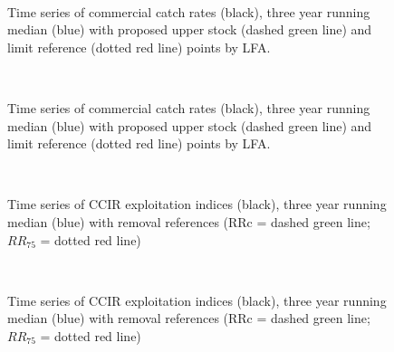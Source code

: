 \documentclass[11pt]{article}
\newcommand{\e}{/backup/bio_data/bio.lobster/figures/} %
\begin{document}
\begin{figure}
        \centering
         \\
                    \caption{Time series of commercial catch rates (black), three year running median (blue) with proposed upper stock (dashed green line) and limit reference (dotted red line) points by LFA.}
        \end{figure}


\begin{figure}
        \centering
         \\
                    \caption{Time series of commercial catch rates (black), three year running median (blue) with proposed upper stock (dashed green line) and limit reference (dotted red line) points by LFA.}
        \end{figure}





\begin{figure}
        \centering
         \\
                    \caption{Time series of CCIR exploitation indices (black), three year running median (blue) with removal references (RRc = dashed green line; $RR_{75}$ = dotted red line)}
        \end{figure}

\begin{figure}
        \centering
         \\
                    
                \caption{Time series of CCIR exploitation indices (black), three year running median (blue) with removal references (RRc = dashed green line; $RR_{75}$ = dotted red line)}
        \end{figure}
\end{document}
